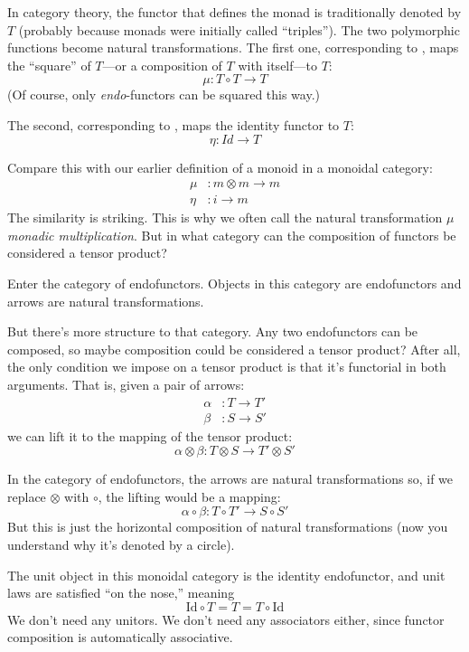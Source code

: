 \documentclass[DaoFP]{subfiles}
\begin{document}
In category theory, the functor that defines the monad is traditionally denoted by $T$ (probably because monads were initially called ``triples''). The two polymorphic functions become natural transformations. The first one, corresponding to , maps the ``square'' of $T$---or a composition of $T$ with itself---to $T$:
\[ \mu \colon T \circ T \to T \]
(Of course, only \emph{endo}-functors can be squared this way.) 

The second, corresponding to , maps the identity functor to $T$:
\[ \eta \colon Id \to T \]

Compare this with our earlier definition of a monoid in a monoidal category:
\begin{align*}
\mu &\colon m \otimes m \to m \\
\eta &\colon i \to m
\end{align*}
The similarity is striking. This is why we often call the natural transformation $\mu$ \emph{monadic multiplication}. But in what category can the composition of functors be considered a tensor product? 

Enter the category of endofunctors. Objects in this category are endofunctors and arrows are natural transformations. 

But there's more structure to that category. Any two endofunctors can be composed, so maybe composition could be considered a tensor product? After all, the only condition we impose on a tensor product is that it's functorial in both arguments. That is, given a pair of arrows:
\begin{align*}
 \alpha &\colon T \to T' \\
 \beta &\colon S \to S' 
\end{align*}
 we can lift it to the mapping of the tensor product:
 \[ \alpha \otimes \beta \colon T \otimes S \to T' \otimes S' \]
 
 In the category of endofunctors, the arrows are natural transformations so, if we replace $\otimes$ with $\circ$, the lifting would be a mapping:
\[ \alpha \circ \beta \colon T \circ T' \to S \circ S' \]
But this is just the horizontal composition of natural transformations (now you understand why it's denoted by a circle).

The unit object in this monoidal category is the identity endofunctor, and unit laws are satisfied ``on the nose,'' meaning
\[ \text{Id} \circ T = T = T \circ \text{Id}\]
We don't need any unitors. We don't need any associators either, since functor composition is automatically associative. 
\end{document}
